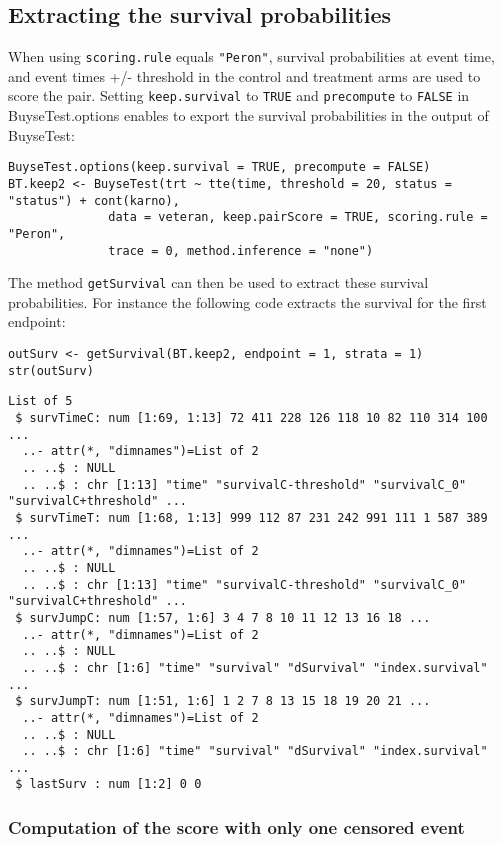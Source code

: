 \documentclass[12pt]{article}
\begin{document}
\subsection{Extracting the survival probabilities}
\label{sec:org0b25ba1}
When using \texttt{scoring.rule} equals \texttt{"Peron"}, survival probabilities at
event time, and event times +/- threshold in the control and treatment
arms are used to score the pair. Setting \texttt{keep.survival} to \texttt{TRUE} and
\texttt{precompute} to \texttt{FALSE} in BuyseTest.options enables to export the
survival probabilities in the output of BuyseTest:
\lstset{language=r,label= ,caption= ,captionpos=b,numbers=none}
\begin{lstlisting}
BuyseTest.options(keep.survival = TRUE, precompute = FALSE)
BT.keep2 <- BuyseTest(trt ~ tte(time, threshold = 20, status = "status") + cont(karno),
		      data = veteran, keep.pairScore = TRUE, scoring.rule = "Peron",
		      trace = 0, method.inference = "none")
\end{lstlisting}

The method \texttt{getSurvival} can then be used to extract these survival
probabilities. For instance the following code extracts the survival
for the first endpoint:
\lstset{language=r,label= ,caption= ,captionpos=b,numbers=none}
\begin{lstlisting}
outSurv <- getSurvival(BT.keep2, endpoint = 1, strata = 1)
str(outSurv)
\end{lstlisting}

\begin{verbatim}
List of 5
 $ survTimeC: num [1:69, 1:13] 72 411 228 126 118 10 82 110 314 100 ...
  ..- attr(*, "dimnames")=List of 2
  .. ..$ : NULL
  .. ..$ : chr [1:13] "time" "survivalC-threshold" "survivalC_0" "survivalC+threshold" ...
 $ survTimeT: num [1:68, 1:13] 999 112 87 231 242 991 111 1 587 389 ...
  ..- attr(*, "dimnames")=List of 2
  .. ..$ : NULL
  .. ..$ : chr [1:13] "time" "survivalC-threshold" "survivalC_0" "survivalC+threshold" ...
 $ survJumpC: num [1:57, 1:6] 3 4 7 8 10 11 12 13 16 18 ...
  ..- attr(*, "dimnames")=List of 2
  .. ..$ : NULL
  .. ..$ : chr [1:6] "time" "survival" "dSurvival" "index.survival" ...
 $ survJumpT: num [1:51, 1:6] 1 2 7 8 13 15 18 19 20 21 ...
  ..- attr(*, "dimnames")=List of 2
  .. ..$ : NULL
  .. ..$ : chr [1:6] "time" "survival" "dSurvival" "index.survival" ...
 $ lastSurv : num [1:2] 0 0
\end{verbatim}

\subsubsection{Computation of the score with only one censored event}
\label{sec:orge6de307}
\end{document}
